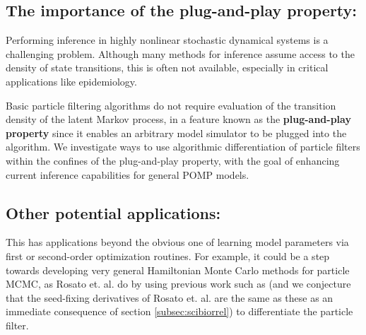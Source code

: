 \documentclass[9pt,twocolumn,twoside]{pnas-new}
\begin{document}
\subsection*{The importance of the plug-and-play property:} Performing inference in highly nonlinear stochastic dynamical systems is a challenging problem. Although many methods for inference assume access to the density of state transitions, this is often not available, especially in critical applications like epidemiology.

Basic particle filtering algorithms do not require evaluation of the transition density of the latent Markov process, in a feature known as the \textbf{plug-and-play property} \cite{breto09} since it enables an arbitrary model simulator to be plugged into the algorithm. We investigate ways to use algorithmic differentiation of particle filters within the confines of the plug-and-play property, with the goal of enhancing current inference capabilities for general POMP models.

\subsection*{Other potential applications:} This has applications beyond the obvious one of learning model parameters via first or second-order optimization routines. For example, it could be a step towards developing very general Hamiltonian Monte Carlo methods for particle MCMC, as Rosato et. al. \cite{rosato22b} do by using previous work such as \cite{scibior21, poyiadjis11} (and we conjecture that the seed-fixing derivatives of Rosato et. al. are the same as these as an immediate consequence of section \ref{subsec:scibiorrel}) to differentiate the particle filter. 


\end{document}
